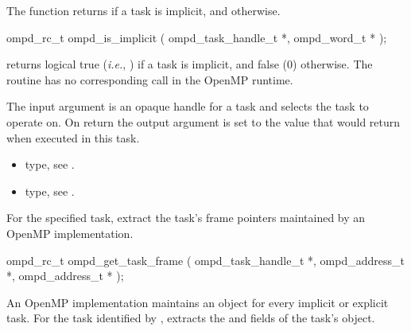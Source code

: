\label{subsubsubsec:ompd_is_implicit}
\summary
The  function returns  if a task is implicit, and  otherwise.

\format
\begin{cspecific}
\begin{ompSyntax}
ompd_rc_t ompd_is_implicit (
  ompd_task_handle_t *,
  ompd_word_t *
);
\end{ompSyntax}
\end{cspecific}

\descr
{} returns logical true (\textit{i.e.}, )
if a task is implicit, and false (0) otherwise.
The routine has no corresponding call in the OpenMP runtime.

\argdesc
The input argument  is an opaque handle for a task and selects the task to operate on.
On return the output argument  is set to the value that  would return when
executed in this task.

\crossreferences
\begin{itemize}
	\item {} type, see .
	\item {} type, see .
\end{itemize}



%
\label{subsubsubsec:ompd_get_task_frame}
\summary
For the specified task, extract the task's frame pointers maintained by an OpenMP implementation.

\format
\begin{cspecific}
\begin{ompSyntax}
ompd_rc_t ompd_get_task_frame (
  ompd_task_handle_t *,
  ompd_address_t *,
  ompd_address_t *
);
\end{ompSyntax}
\end{cspecific}



\descr
An OpenMP implementation  maintains an  object for every implicit or explicit task. 
For the task identified by ,  extracts 
the  and  fields of the task's  object.

